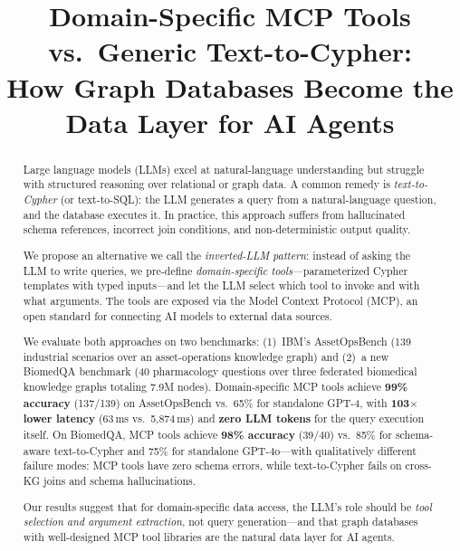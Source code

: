 \documentclass[sigconf, anonymous, review]{acmart}
\begin{document}
\title{Domain-Specific MCP Tools vs.\ Generic Text-to-Cypher:\\How Graph Databases Become the Data Layer for AI Agents}



\begin{abstract}
Large language models (LLMs) excel at natural-language understanding
but struggle with structured reasoning over relational or graph data.
A common remedy is \emph{text-to-Cypher} (or text-to-SQL): the LLM
generates a query from a natural-language question, and the database
executes it.  In practice, this approach suffers from hallucinated
schema references, incorrect join conditions, and
non-deterministic output quality.

We propose an alternative we call the \emph{inverted-LLM pattern}:
instead of asking the LLM to write queries, we pre-define
\emph{domain-specific tools}---parameterized Cypher templates with
typed inputs---and let the LLM select which tool to invoke and with
what arguments.  The tools are exposed via the Model Context Protocol
(MCP), an open standard for connecting AI models to external data
sources.

We evaluate both approaches on two benchmarks:
(1)~IBM's AssetOpsBench (139 industrial scenarios over an asset-operations
knowledge graph) and (2)~a new BiomedQA benchmark (40 pharmacology
questions over three federated biomedical knowledge graphs totaling
7.9M nodes).  Domain-specific MCP tools achieve
\textbf{99\% accuracy} (137/139) on AssetOpsBench vs.\ 65\% for
standalone GPT-4, with \textbf{103$\times$ lower latency} (63\,ms
vs.\ 5,874\,ms) and \textbf{zero LLM tokens} for the query execution
itself.  On BiomedQA, MCP tools achieve \textbf{98\% accuracy}
(39/40) vs.\ 85\% for schema-aware text-to-Cypher and 75\% for
standalone GPT-4o---with qualitatively different failure modes:
MCP tools have zero schema errors, while text-to-Cypher fails
on cross-KG joins and schema hallucinations.

Our results suggest that for domain-specific data access,
the LLM's role should be \emph{tool selection and argument
extraction}, not query generation---and that graph databases
with well-designed MCP tool libraries are the natural data layer
for AI agents.
\end{abstract}

\maketitle
\end{document}
